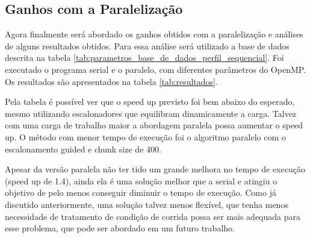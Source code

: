 \documentclass[12pt]{article}
\begin{document}
\subsection{Ganhos com a Paralelização}

Agora finalmente será abordado os ganhos obtidos com a paralelização e análises de alguns resultados obtidos. Para essa análise será utilizado a base de dados descrita na tabela \ref{tab:parametros_base_de_dados_perfil_sequencial}. Foi executado o programa serial e o paralelo, com diferentes parâmetros do OpenMP. Os resultados são apresentados na tabela \ref{tab:resultados}.

Pela tabela é possível ver que o speed up previsto foi bem abaixo do esperado, mesmo utilizando escalonadores que equilibram dinamicamente a carga. Talvez com uma carga de trabalho maior a abordagem paralela possa aumentar o speed up. O método com menor tempo de execução foi o algoritmo paralelo com o escalonamento guided e chunk size de 400.

Apesar da versão paralela não ter tido um grande melhora no tempo de execução (speed up de 1.4), ainda ela é uma solução melhor que a serial e atingiu o objetivo de pelo menos conseguir diminuir o tempo de execução. Como já discutido anteriormente, uma solução talvez menos flexível, que tenha menos necessidade de tratamento de condição de corrida possa ser mais adequada para esse problema, que pode ser abordado em um futuro trabalho.

\end{document}
